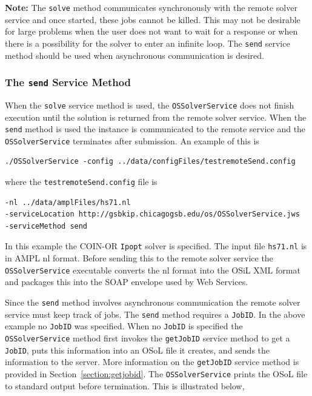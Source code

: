 \documentclass[11pt]{article}
\renewcommand{\_}{{\char"5F}}
\renewcommand{\{}{{\char"7B}}
\renewcommand{\}}{{\char"7D}}
\renewcommand{\^}{{\char"0D}}
\renewcommand{\'}{{\char"0D}}
\begin{document}
\begin{enumerate}[Step 1:]
{\bf Note:} The {\tt solve} method communicates synchronously with the remote solver service 
and once started, these jobs cannot be killed. This may not be desirable for large 
problems when the user does not want to wait for a response or when there is a possibility
for the solver to enter an infinite loop. The {\tt send} service 
method should be used when asynchronous communication is desired.


\subsubsection{The  {\tt send} Service Method}\label{section:send}

When the {\tt solve} service method is used, the {\tt OSSolverService} does not 
finish execution until the solution is returned from the remote solver service. 
 When the {\tt send} 
method is used the instance is communicated to the remote service and the 
{\tt OSSolverService} terminates after submission. An example of this is
\begin{verbatim}
./OSSolverService -config ../data/configFiles/testremoteSend.config
\end{verbatim}
where the {\tt testremoteSend.config} file is
\begin{verbatim}
-nl ../data/amplFiles/hs71.nl
-serviceLocation http://gsbkip.chicagogsb.edu/os/OSSolverService.jws
-serviceMethod send
\end{verbatim}
In this example the COIN-OR {\tt Ipopt} solver is specified. The input file {\tt hs71.nl} 
is in AMPL nl format. 
Before sending this to the remote solver service the {\tt OSSolverService} executable converts  
the nl format into the OSiL XML format and packages this into the SOAP 
envelope used by Web Services.

Since the {\tt send} method involves asynchronous communication the remote solver service must keep track of jobs. 
The {\tt send} method requires a {\tt JobID}. In the above example no {\tt JobID} was specified.
When no {\tt JobID} is specified the {\tt OSSolverService} method first invokes the {\tt getJobID} service method 
to get a {\tt JobID}, puts this information into an OSoL file it creates, and sends the information 
to the server. More information on the {\tt getJobID} service method is provided in Section~\ref{section:getjobid}.  
The {\tt OSSolverService} prints the OSoL file to standard output before termination. 
This is illustrated below,


\end{enumerate}
\end{document}
